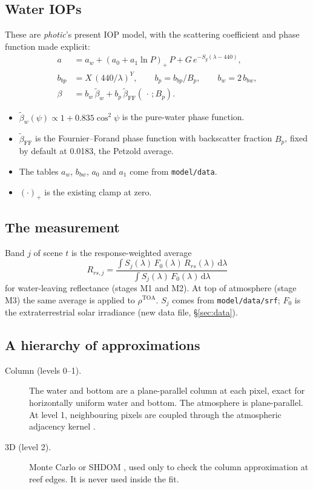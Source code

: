 \documentclass[11pt]{article}
\numberwithin{equation}{section}
\newcommand{\rTOA}{\rho^{\mathrm{TOA}}}
\newcommand{\dd}{\,\mathrm{d}}
\newcommand{\code}[1]{\texttt{#1}}
\begin{document}
\subsection{Water IOPs}

These are \textit{photic}'s present IOP model, with the scattering coefficient and phase
function made explicit:
\begin{align}
a &= a_w + (a_0 + a_1\ln P)_+\,P + G\,e^{-S_g(\lambda-440)}, \label{eq:iop-a}\\
b_{bp} &= X\,(440/\lambda)^{Y}, \qquad b_p = b_{bp}/B_p, \qquad b_w = 2\,b_{bw}, \label{eq:iop-b}\\
\beta &= b_w\,\tilde\beta_w + b_p\,\tilde\beta_{\mathrm{FF}}(\,\cdot\,;B_p). \label{eq:iop-beta}
\end{align}
\begin{itemize}
\item $\tilde\beta_w(\psi) \propto 1 + 0.835\cos^2\psi$ is the pure-water phase function.
\item $\tilde\beta_{\mathrm{FF}}$ is the Fournier--Forand phase function \cite{fournier1994} with
backscatter fraction $B_p$, fixed by default at 0.0183, the Petzold average.
\item The tables $a_w$, $b_{bw}$, $a_0$ and $a_1$ come from \code{model/data}.
\item $(\cdot)_+$ is the existing clamp at zero.
\end{itemize}

\subsection{The measurement}

Band $j$ of scene $t$ is the response-weighted average
\begin{equation}\label{eq:obs}
R_{rs,j} = \frac{\int S_j(\lambda)\,F_0(\lambda)\,R_{rs}(\lambda)\dd\lambda}{\int S_j(\lambda)\,F_0(\lambda)\dd\lambda}
\end{equation}
for water-leaving reflectance (stages M1 and M2). At top of atmosphere (stage M3) the same
average is applied to $\rTOA$. $S_j$ comes from \code{model/data/srf}; $F_0$ is the
extraterrestrial solar irradiance (new data file, \S\ref{sec:data}).

\subsection{A hierarchy of approximations}

\begin{description}
\item[Column (levels 0--1).] The water and bottom are a plane-parallel column at each pixel,
exact for horizontally uniform water and bottom. The atmosphere is plane-parallel. At level
1, neighbouring pixels are coupled through the atmospheric adjacency kernel
\cite{tanre1981,vermote1997}.
\item[3D (level 2).] Monte Carlo or SHDOM \cite{evans1998}, used only to check the column
approximation at reef edges. It is never used inside the fit.
\end{description}
\end{document}

